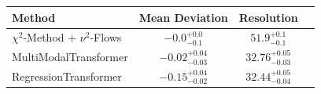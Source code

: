     \begin{tabular}{lccc}
        \toprule
        Method & Mean Deviation & Resolution \\
        \midrule
        $\chi^2$-Method + $\nu^2$-Flows & $-0.0_{-0.1}^{+0.0}$ & $51.9_{-0.1}^{+0.1}$ \\
        MultiModalTransformer & $-0.02_{-0.03}^{+0.04}$ & $32.76_{-0.03}^{+0.05}$ \\
        RegressionTransformer & $-0.15_{-0.02}^{+0.04}$ & $32.44_{-0.04}^{+0.05}$ \\
        \bottomrule
    \end{tabular}